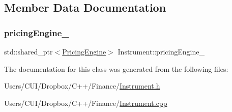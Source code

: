 \subsection{Member Data Documentation}
\hypertarget{class_instrument_a6fdd5548ccc944536ff73913d98bf598}{}\label{class_instrument_a6fdd5548ccc944536ff73913d98bf598} 
\subsubsection{\texorpdfstring{pricing\+Engine\+\_\+}{pricingEngine\_}}
{\footnotesize\ttfamily std\+::shared\+\_\+ptr$<$\hyperlink{class_pricing_engine}{Pricing\+Engine}$>$ Instrument\+::pricing\+Engine\+\_\+\hspace{0.3cm}{\ttfamily [protected]}}



The documentation for this class was generated from the following files\+:\begin{DoxyCompactItemize}
\item 
Users/\+C\+U\+I/\+Dropbox/\+C++/\+Finance/\hyperlink{_instrument_8h}{Instrument.\+h}\item 
Users/\+C\+U\+I/\+Dropbox/\+C++/\+Finance/\hyperlink{_instrument_8cpp}{Instrument.\+cpp}\end{DoxyCompactItemize}
